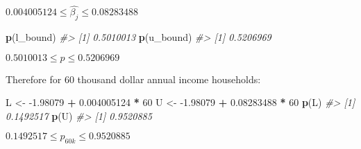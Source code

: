 \documentclass[]{article}
\newenvironment{Shaded}{\begin{snugshade}}{\end{snugshade}}
\newcommand{\CommentTok}[1]{\textcolor[rgb]{0.56,0.35,0.01}{\textit{#1}}}
\newcommand{\DecValTok}[1]{\textcolor[rgb]{0.00,0.00,0.81}{#1}}
\newcommand{\FloatTok}[1]{\textcolor[rgb]{0.00,0.00,0.81}{#1}}
\newcommand{\KeywordTok}[1]{\textcolor[rgb]{0.13,0.29,0.53}{\textbf{#1}}}
\newcommand{\NormalTok}[1]{#1}
\newcommand{\OperatorTok}[1]{\textcolor[rgb]{0.81,0.36,0.00}{\textbf{#1}}}
\newcommand{\StringTok}[1]{\textcolor[rgb]{0.31,0.60,0.02}{#1}}
\begin{document}
\(0.004005124 \leq \hat{\beta_{j}} \leq 0.08283488\)

\begin{Shaded}
\begin{Highlighting}[]
\KeywordTok{p}\NormalTok{(l_bound)}
\CommentTok{#> [1] 0.5010013}
\KeywordTok{p}\NormalTok{(u_bound)}
\CommentTok{#> [1] 0.5206969}
\end{Highlighting}
\end{Shaded}

\(0.5010013 \leq p \leq 0.5206969\)

Therefore for 60 thousand dollar annual income households:

\begin{Shaded}
\begin{Highlighting}[]
\NormalTok{L <-}\StringTok{ }\FloatTok{-1.98079} \OperatorTok{+}\StringTok{ }\FloatTok{0.004005124} \OperatorTok{*}\StringTok{ }\DecValTok{60}
\NormalTok{U <-}\StringTok{ }\FloatTok{-1.98079} \OperatorTok{+}\StringTok{ }\FloatTok{0.08283488} \OperatorTok{*}\StringTok{ }\DecValTok{60}
\KeywordTok{p}\NormalTok{(L)}
\CommentTok{#> [1] 0.1492517}
\KeywordTok{p}\NormalTok{(U)}
\CommentTok{#> [1] 0.9520885}
\end{Highlighting}
\end{Shaded}

\(0.1492517 \leq p_{60k} \leq 0.9520885\)
\end{document}
